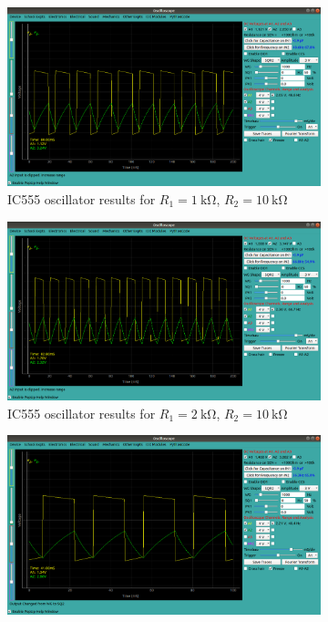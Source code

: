 \documentclass[%
 aip,
 amsmath,amssymb,
 reprint, floatfix%
]{revtex4-1}
\begin{document}
    \begin{figure}
        \centering
        \begin{subfigure}[b]{0.5\textwidth}
            \centering
            \includegraphics[scale = 0.19]{Figures/ic555_1,10.png}
            \caption{IC555 oscillator results for $R_1 = \SI{1}{\kilo \ohm}$, $R_2 = \SI{10}{\kilo \ohm}$}
            \label{fig:90spec}
        \end{subfigure}
        \hfill
        \begin{subfigure}[b]{0.5\textwidth}
            \centering
            \includegraphics[scale = 0.19]{Figures/ic555_2,10.png}
            \caption{IC555 oscillator results for $R_1 = \SI{2}{\kilo \ohm}$, $R_2 = \SI{10}{\kilo \ohm}$}
            \label{fig:90gate}
        \end{subfigure}
        \hfill
        \begin{subfigure}[b]{0.5\textwidth}
            \centering
            \includegraphics[scale = 0.19]{Figures/ic555_10,10.png}

\end{subfigure}
\end{figure}
\end{document}

